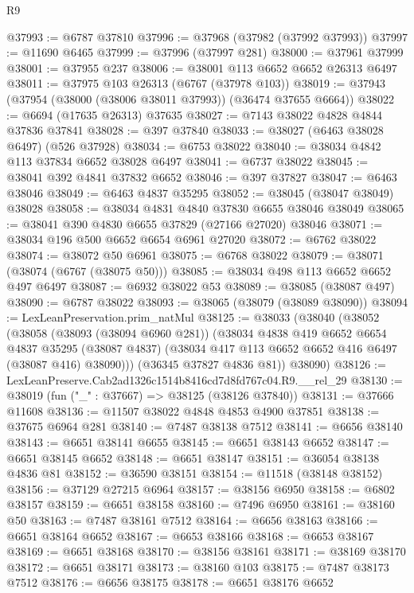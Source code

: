 \begin{lexlean}{R9}
\begin{coremodule}
@37993 := @6787 @37810
@37996 := @37968 (@37982 (@37992 @37993))
@37997 := @11690 @6465
@37999 := @37996 (@37997 @281)
@38000 := @37961 @37999
@38001 := @37955 @237
@38006 := @38001 @113 @6652 @6652 @26313 @6497
@38011 := @37975 @103 @26313 (@6767 (@37978 @103))
@38019 := @37943 (@37954 (@38000 (@38006 @38011 @37993)) (@36474 @37655 @6664))
@38022 := @6694 (@17635 @26313) @37635
@38027 := @7143 @38022 @4828 @4844 @37836 @37841
@38028 := @397 @37840
@38033 := @38027 (@6463 @38028 @6497) (@526 @37928)
@38034 := @6753 @38022
@38040 := @38034 @4842 @113 @37834 @6652 @38028 @6497
@38041 := @6737 @38022
@38045 := @38041 @392 @4841 @37832 @6652
@38046 := @397 @37827
@38047 := @6463 @38046
@38049 := @6463 @4837 @35295
@38052 := @38045 (@38047 @38049) @38028
@38058 := @38034 @4831 @4840 @37830 @6655 @38046 @38049
@38065 := @38041 @390 @4830 @6655 @37829 (@27166 @27020) @38046
@38071 := @38034 @196 @500 @6652 @6654 @6961 @27020
@38072 := @6762 @38022
@38074 := @38072 @50 @6961
@38075 := @6768 @38022
@38079 := @38071 (@38074 (@6767 (@38075 @50)))
@38085 := @38034 @498 @113 @6652 @6652 @497 @6497
@38087 := @6932 @38022 @53
@38089 := @38085 (@38087 @497)
@38090 := @6787 @38022
@38093 := @38065 (@38079 (@38089 @38090))
@38094 := LexLeanPreservation.prim_natMul
@38125 := @38033
    (@38040
      (@38052
        (@38058
          (@38093 (@38094 @6960 @281))
          (@38034
            @4838
            @419
            @6652
            @6654
            @4837
            @35295
            (@38087 @4837)
            (@38034 @417 @113 @6652 @6652 @416 @6497 (@38087 @416) @38090)))
        (@36345 @37827 @4836 @81))
      @38090)
@38126 := LexLeanPreserve.Cab2ad1326c1514b8416cd7d8fd767c04.R9.__rel_29
@38130 := @38019 (fun ("_" : @37667) => @38125 (@38126 @37840))
@38131 := @37666 @11608
@38136 := @11507 @38022 @4848 @4853 @4900 @37851
@38138 := @37675 @6964 @281
@38140 := @7487 @38138 @7512
@38141 := @6656 @38140
@38143 := @6651 @38141 @6655
@38145 := @6651 @38143 @6652
@38147 := @6651 @38145 @6652
@38148 := @6651 @38147
@38151 := @36054 @38138 @4836 @81
@38152 := @36590 @38151
@38154 := @11518 (@38148 @38152)
@38156 := @37129 @27215 @6964
@38157 := @38156 @6950
@38158 := @6802 @38157
@38159 := @6651 @38158
@38160 := @7496 @6950
@38161 := @38160 @50
@38163 := @7487 @38161 @7512
@38164 := @6656 @38163
@38166 := @6651 @38164 @6652
@38167 := @6653 @38166
@38168 := @6653 @38167
@38169 := @6651 @38168
@38170 := @38156 @38161
@38171 := @38169 @38170
@38172 := @6651 @38171
@38173 := @38160 @103
@38175 := @7487 @38173 @7512
@38176 := @6656 @38175
@38178 := @6651 @38176 @6652

\end{coremodule}
\end{lexlean}
